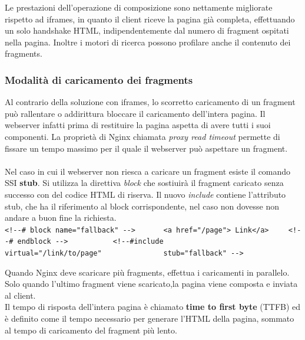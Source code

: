 Le prestazioni dell'operazione di composizione sono nettamente migliorate rispetto ad iframes, 
in quanto il client riceve la pagina già completa, effettuando un solo handshake HTML, indipendentemente dal numero
di fragment ospitati nella pagina. Inoltre i motori di ricerca possono profilare anche il contenuto dei fragments.

\subsubsection{Modalità di caricamento dei fragments}
Al contrario della soluzione con iframes, lo scorretto caricamento di un fragment può rallentare o addirittura bloccare 
il caricamento dell'intera pagina. Il webserver infatti prima di restituire la pagina aspetta di avere tutti  i suoi componenti.
La proprietà di Nginx chiamata \emph{proxy read timeout} permette di fissare un tempo massimo per il quale il webserver 
può aspettare un fragment.
\\\\
Nel caso in cui il webserver non riesca a caricare un fragment esiste il comando SSI \textbf{stub}.
Si utilizza la direttiva \emph{block} che sostiuirà il fragment caricato senza successo con del codice HTML di riserva.
Il nuovo \emph{include} contiene l'attributo stub, che ha il riferimento al block corrispondente, nel caso non dovesse non andare
a buon fine la richiesta.
\\

\verb|<!--# block name="fallback" -->|\linebreak
\verb|      <a href="/page"> Link</a>|\linebreak
\verb|    <!--# endblock -->|\linebreak
\verb|          <!--#include|\linebreak
\verb|              virtual="/link/to/page"|\linebreak
\verb|              stub="fallback" -->|\linebreak


Quando Nginx deve scaricare più fragments, effettua i caricamenti in parallelo.
Solo quando l'ultimo fragment viene scaricato,la pagina viene composta e inviata al client.
\\
Il tempo di risposta dell'intera pagina è chiamato \textbf{time to first byte} (TTFB) ed è definito 
come il tempo necessario per generare l’HTML della pagina, sommato al tempo di caricamento del fragment più lento.

